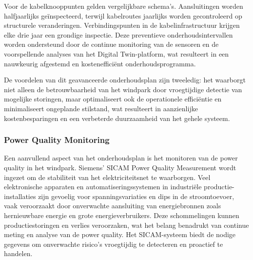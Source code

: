 Voor de kabelknooppunten gelden vergelijkbare schema's. Aansluitingen worden halfjaarlijks geïnspecteerd, terwijl kabelroutes jaarlijks worden gecontroleerd op structurele veranderingen. Verbindingspunten in de kabelinfrastructuur krijgen elke drie jaar een grondige inspectie. Deze preventieve onderhoudsintervallen worden ondersteund door de continue monitoring van de sensoren en de voorspellende analyses van het Digital Twin-platform, wat resulteert in een nauwkeurig afgestemd en kostenefficiënt onderhoudsprogramma.

De voordelen van dit geavanceerde onderhoudsplan zijn tweeledig: het waarborgt niet alleen de betrouwbaarheid van het windpark door vroegtijdige detectie van mogelijke storingen, maar optimaliseert ook de operationele efficiëntie en minimaliseert ongeplande stilstand, wat resulteert in aanzienlijke kostenbesparingen en een verbeterde duurzaamheid van het gehele systeem\cite{5460911,5256318,10269370}.

\subsubsection{Power Quality Monitoring}
Een aanvullend aspect van het onderhoudsplan is het monitoren van de power quality in het windpark. Siemens' SICAM Power Quality Measurement wordt ingezet om de stabiliteit van het elektriciteitsnet te waarborgen. Veel elektronische apparaten en automatiseringssystemen in industriële productie-installaties zijn gevoelig voor spanningsvariaties en dips in de stroomtoevoer, vaak veroorzaakt door onverwachte aansluiting van energiebronnen zoals hernieuwbare energie en grote energieverbruikers\cite{siemens-power-quality-measurement}. Deze schommelingen kunnen productiestoringen en verlies veroorzaken, wat het belang benadrukt van continue meting en analyse van de power quality. Het SICAM-systeem biedt de nodige gegevens om onverwachte risico's vroegtijdig te detecteren en proactief te handelen\cite{siemens-power-quality-measurement}.

